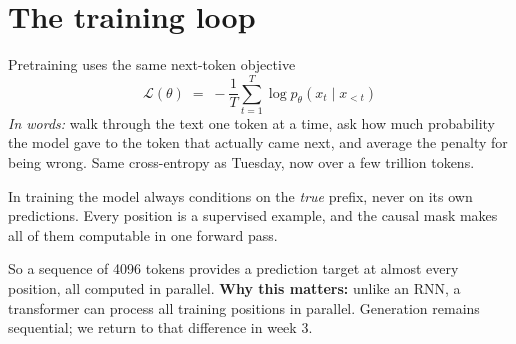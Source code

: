 \documentclass[aspectratio=169,10pt]{beamer}
\begin{document}
\section{The training loop}

\begin{frame}{Pretraining uses the same next-token objective}
  \[
    \mathcal{L}(\theta) \;=\; -\frac{1}{T}\sum_{t=1}^{T}
      \log p_\theta\!\left(x_t \mid x_{<t}\right)
  \]
  \emph{In words:} walk through the text one token at a time, ask how much
  probability the model gave to the token that actually came next, and average
  the penalty for being wrong. Same cross-entropy as Tuesday, now over a few
  trillion tokens.
  \vspace{0.3em}

   In training the model always conditions on the
  \emph{true} prefix, never on its own predictions. Every position is a
  supervised example, and the causal mask makes all of them computable in one
  forward pass.
  \vspace{0.3em}

  So a sequence of 4096 tokens provides a prediction target at almost every
  position, all computed in parallel.
  \vspace{0.4em}
  \small
  \textbf{Why this matters:} unlike an RNN, a transformer can process all
  training positions in parallel. Generation remains sequential; we return to
  that difference in week 3.
\end{frame}
\end{document}
